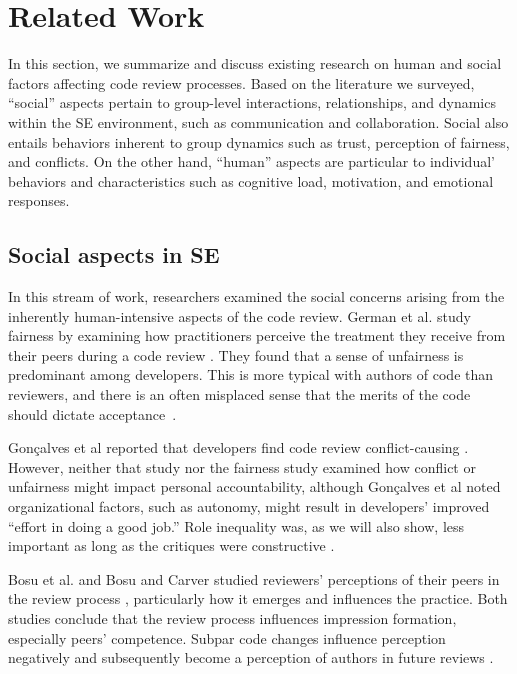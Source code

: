 \section{Related Work}\label{sec:related}

In this section, we summarize and discuss existing research on human and social factors affecting code review processes. Based on the literature we surveyed, ``social'' aspects pertain to group-level interactions, relationships, and dynamics within the SE environment, such as communication and collaboration. Social also entails behaviors inherent to group dynamics such as trust, perception of fairness, and conflicts. On the other hand, ``human'' aspects are particular to individual' behaviors and characteristics such as cognitive load, motivation, and emotional responses.

\subsection{Social aspects in SE}

In this stream of work, researchers examined the social concerns arising from the inherently human-intensive aspects of the code review. German et al. study fairness by examining how practitioners perceive the treatment they receive from their peers during a code review \citep{german2018my}. They found that a sense of unfairness is predominant among developers. This is more typical with authors of code than reviewers, and there is an often misplaced sense that the merits of the code should dictate acceptance~\citep{german2018my}.

Gon\c{c}alves et al reported that developers find code review conflict-causing \citep{goncalves22}. However, neither that study nor the fairness study \citep{german2018my} examined how conflict or unfairness might impact personal accountability, although Gon\c{c}alves et al noted organizational factors, such as autonomy, might result in developers' improved ``effort in doing a good job.'' Role inequality was, as we will also show, less important as long as the critiques were constructive \citep{goncalves22}. 

Bosu et al. and Bosu and Carver studied reviewers' perceptions of their peers in the review process \citep{bosu2013impact,bosu2016process}, particularly how it emerges and influences the practice. Both studies conclude that the review process influences impression formation, especially peers' competence. Subpar code changes influence perception negatively and subsequently become a perception of authors in future reviews \citep{bosu2013impact,bosu2016process}.

